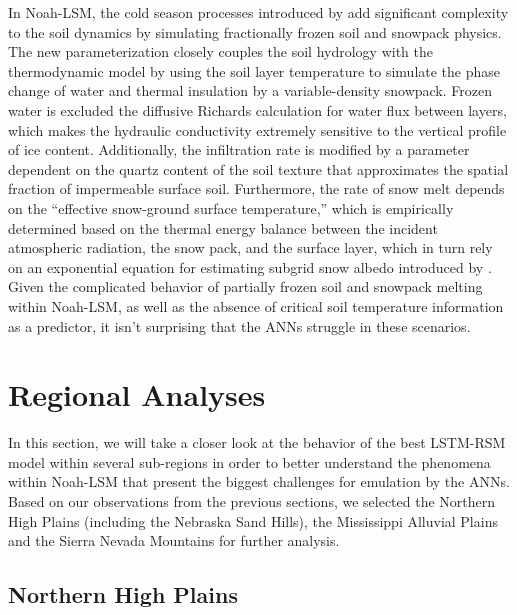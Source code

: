 In Noah-LSM, the cold season processes introduced by \citep{koren_parameterization_1999} add significant complexity to the soil dynamics by simulating fractionally frozen soil and snowpack physics. The new parameterization closely couples the soil hydrology with the thermodynamic model by using the soil layer temperature to simulate the phase change of water and thermal insulation by a variable-density snowpack. Frozen water is excluded the diffusive Richards calculation for water flux between layers, which makes the hydraulic conductivity extremely sensitive to the vertical profile of ice content. Additionally, the infiltration rate is modified by a parameter dependent on the quartz content of the soil texture that approximates the spatial fraction of impermeable surface soil. Furthermore, the rate of snow melt depends on the ``effective snow-ground surface temperature,'' which is empirically determined based on the thermal energy balance between the incident atmospheric radiation, the snow pack, and the surface layer, which in turn rely on an exponential equation for estimating subgrid snow albedo introduced by \citep{barlage_noah_2010}. Given the complicated behavior of partially frozen soil and snowpack melting within Noah-LSM, as well as the absence of critical soil temperature information as a predictor, it isn't surprising that the ANNs struggle in these scenarios.

\section{Regional Analyses}

In this section, we will take a closer look at the behavior of the best LSTM-RSM model within several sub-regions in order to better understand the phenomena within Noah-LSM that present the biggest challenges for emulation by the ANNs. Based on our observations from the previous sections, we selected the Northern High Plains (including the Nebraska Sand Hills), the Mississippi Alluvial Plains and the Sierra Nevada Mountains for further analysis.

\subsection{Northern High Plains}

